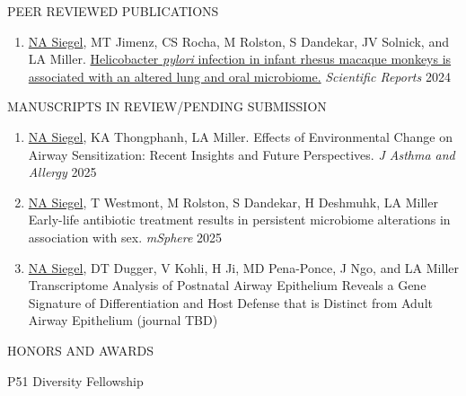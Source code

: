 \documentclass{resume} %
\begin{document}

\begin{rSection}{PEER REVIEWED PUBLICATIONS}
\begin{enumerate}

\item \underline{NA Siegel}, MT Jimenz, CS Rocha, M Rolston, S Dandekar, JV Solnick, and LA Miller. \href{https://pubmed.ncbi.nlm.nih.gov/38693196/}{Helicobacter \textit{pylori} infection in infant rhesus macaque monkeys is associated with an altered lung and oral microbiome.} \emph{Scientific Reports} 2024

\end{enumerate}
\end{rSection}

\begin{rSection}{MANUSCRIPTS IN REVIEW/PENDING SUBMISSION}
\begin{enumerate}

\item \underline{NA Siegel}, KA Thongphanh, LA Miller. Effects of Environmental Change on Airway Sensitization: Recent Insights and Future Perspectives. \emph{J Asthma and Allergy} 2025

\item  \underline{NA Siegel}, T Westmont, M Rolston, S Dandekar, H Deshmuhk, LA Miller Early-life antibiotic treatment results in persistent microbiome alterations in association with sex. \emph{mSphere} 2025

\item  \underline{NA Siegel}, DT Dugger, V Kohli, H Ji, MD Pena-Ponce, J Ngo, and LA Miller Transcriptome Analysis of Postnatal Airway Epithelium Reveals a Gene Signature of Differentiation and Host Defense that is Distinct from Adult Airway Epithelium (journal TBD)

\end{enumerate}
\end{rSection}



\begin{rSection}{HONORS AND AWARDS}
\item P51 Diversity Fellowship  
\end{rSection}
\end{document}
